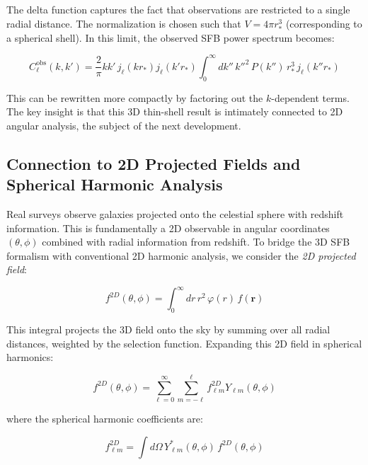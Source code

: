 The delta function captures the fact that observations are restricted to a single radial distance. The normalization is chosen such that $V = 4\pi r_*^3$ (corresponding to a spherical shell). In this limit, the observed SFB power spectrum becomes:

\begin{equation}
C_\ell^{\text{obs}}(k, k') = \frac{2}{\pi} k k' \, j_\ell(k r_*) j_\ell(k' r_*) \int_0^\infty dk'' \, k''^2 \, P(k'') \, r_*^3 \, j_\ell(k'' r_*)
\label{eq:thin_shell_power}
\end{equation}

This can be rewritten more compactly by factoring out the $k$-dependent terms. The key insight is that this 3D thin-shell result is intimately connected to 2D angular analysis, the subject of the next development.

\subsection{Connection to 2D Projected Fields and Spherical Harmonic Analysis}

Real surveys observe galaxies projected onto the celestial sphere with redshift information. This is fundamentally a 2D observable in angular coordinates $(\theta, \phi)$ combined with radial information from redshift. To bridge the 3D SFB formalism with conventional 2D harmonic analysis, we consider the \emph{2D projected field}:

\begin{equation}
f^{2D}(\theta, \phi) = \int_0^\infty dr \, r^2 \, \varphi(r) \, f(\mathbf{r})
\label{eq:projected_2d_field}
\end{equation}

This integral projects the 3D field onto the sky by summing over all radial distances, weighted by the selection function. Expanding this 2D field in spherical harmonics:

\begin{equation}
f^{2D}(\theta, \phi) = \sum_{\ell=0}^\infty \sum_{m=-\ell}^\ell f_{\ell m}^{2D} Y_{\ell m}(\theta, \phi)
\label{eq:sh_expansion_2d}
\end{equation}

where the spherical harmonic coefficients are:

\begin{equation}
f_{\ell m}^{2D} = \int d\Omega \, Y_{\ell m}^*(\theta, \phi) \, f^{2D}(\theta, \phi)
\label{eq:sh_coeff_2d}
\end{equation}

